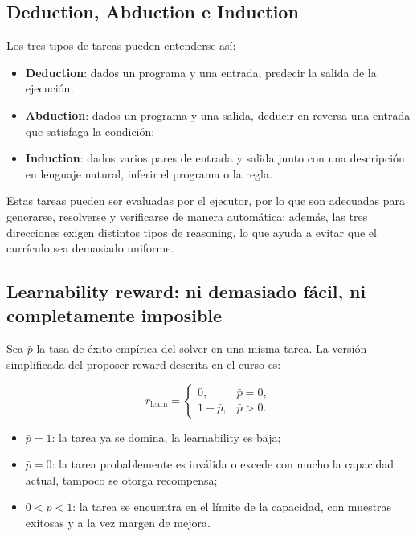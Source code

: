 \documentclass[a4paper]{article}
\begin{document}
\subsection{Deduction, Abduction e Induction}


Los tres tipos de tareas pueden entenderse así:

\begin{itemize}
    \item \textbf{Deduction}: dados un programa y una entrada, predecir la salida de la ejecución;
    \item \textbf{Abduction}: dados un programa y una salida, deducir en reversa una entrada que satisfaga la condición;
    \item \textbf{Induction}: dados varios pares de entrada y salida junto con una descripción en lenguaje natural, inferir el programa o la regla.
\end{itemize}

Estas tareas pueden ser evaluadas por el ejecutor, por lo que son adecuadas para generarse, resolverse y verificarse de manera automática; además, las tres direcciones exigen distintos tipos de reasoning, lo que ayuda a evitar que el currículo sea demasiado uniforme.

\subsection{Learnability reward: ni demasiado fácil, ni completamente imposible}

Sea $\bar p$ la tasa de éxito empírica del solver en una misma tarea. La versión simplificada del proposer reward descrita en el curso es:

$$
r_{\mathrm{learn}}=
\begin{cases}
0, & \bar p=0,\\
1-\bar p, & \bar p>0.
\end{cases}
$$

\begin{itemize}
    \item $\bar p=1$: la tarea ya se domina, la learnability es baja;
    \item $\bar p=0$: la tarea probablemente es inválida o excede con mucho la capacidad actual, tampoco se otorga recompensa;
    \item $0<\bar p<1$: la tarea se encuentra en el límite de la capacidad, con muestras exitosas y a la vez margen de mejora.
\end{itemize}
\end{document}
